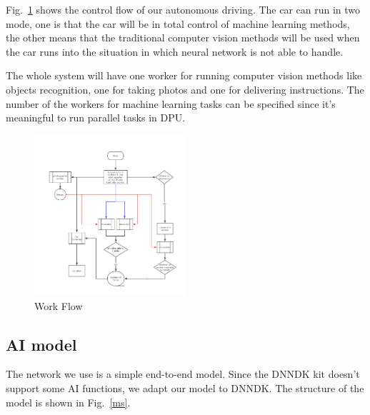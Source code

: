 \documentclass[conference]{IEEEtran}
\begin{document}
Fig.~\ref{wf} shows the control flow of our autonomous driving. The car can run in two mode, one is that the car will be in total control of machine learning methods, the other means that the traditional computer vision methods will be used when the car runs into the situation in which neural network is not able to handle.

The whole system will have one worker for running computer vision methods like objects recognition, one for taking photos and one for delivering instructions. The number of the workers for machine learning tasks can be specified since it's meaningful to run parallel tasks in DPU.

\begin{figure}[htbp]
\centerline{\includegraphics[width=0.5\textwidth]{workFlow.jpg}}
\caption{Work Flow}
\label{wf}
\end{figure}

\subsection{AI model}

The network we use is a simple end-to-end model. Since the DNNDK kit doesn't support some AI functions, we adapt our model to DNNDK. The structure of the model is shown in Fig.~\ref{ms}.  
\end{document}
